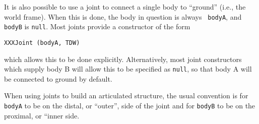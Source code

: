 It is also possible to use a joint to connect a single body to ``ground''
(i.e., the world frame). When this is done, the body in question is always {\tt
bodyA}, and {\tt bodyB} is {\tt null}. Most joints provide a constructor of the
form
%
\begin{lstlisting}[]
  XXXJoint (bodyA, TDW)
\end{lstlisting}
%
which allows this to be done explicitly. Alternatively, most joint
constructors which supply body B will allow this to be specified as
{\tt null}, so that body A will be connected to ground by default.

\begin{sideblock}
When using joints to build an articulated structure, the usual convention is
for {\tt bodyA} to be on the distal, or ``outer'', side of the joint and for
{\tt bodyB} to be on the proximal, or ``inner side.
\end{sideblock}

